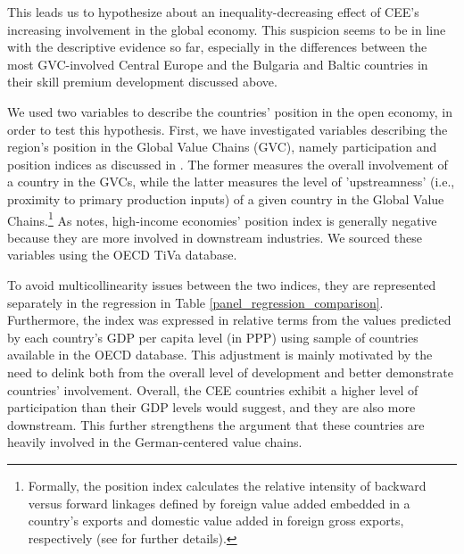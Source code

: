 \documentclass[11pt]{article}
\begin{document}
This leads us to hypothesize about an inequality-decreasing effect of CEE's increasing involvement in the global economy. This suspicion seems to be in line with the descriptive evidence so far, especially in the differences between the most GVC-involved Central Europe and the Bulgaria and Baltic countries in their skill premium development discussed above. 

We used two variables to describe the countries’ position in the open economy, in order to test this hypothesis. First, we have investigated variables describing the region's position in the Global Value Chains (GVC), namely participation and position indices as discussed in \citet{coveri2024global}. The former measures the overall involvement of a country in the GVCs, while the latter measures the level of 'upstreamness' (i.e., proximity to primary production inputs) of a given country in the Global Value Chains.\footnote{Formally, the position index calculates the relative intensity of backward versus forward linkages defined by foreign value added embedded in a country's exports and domestic value added in foreign gross exports, respectively (see \cite{coveri2024global} for further details).} As \cite{coveri2024global} notes, high-income economies' position index is generally negative because they are more involved in downstream industries. We sourced these variables using the OECD TiVa database.

To avoid multicollinearity issues between the two indices, they are represented separately in the regression in Table \ref{panel_regression_comparison}. Furthermore, the index was expressed in relative terms from the values predicted by each country's GDP per capita level (in PPP) using sample of countries available in the OECD database. This adjustment is mainly motivated by the need to delink both from the overall level of development and better demonstrate countries' involvement. Overall, the CEE countries exhibit a higher level of participation than their GDP levels would suggest, and they are also more downstream. This further strengthens the argument that these countries are heavily involved in the German-centered value chains.


\end{document}
